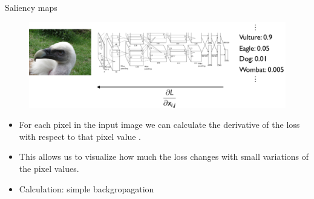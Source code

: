 \documentclass[xcolor=pdftex,dvipsnames,table]{beamer}
\begin{document}
\begin{frame}{Saliency maps}
	\begin{figure}[htb]
	  \centering
	  \includegraphics[width=\textwidth]{../graphics/Vis_saliency_map_principle.png}
	\end{figure}
\begin{itemize}
	\item For each pixel in the input image we can calculate the derivative of the loss with respect to that pixel value \cite{Simonyan:2013}.
	\item This allows us to visualize how much the loss changes with small variations of the pixel values.
	\item Calculation: simple backgropagation 
\end{itemize}
\end{frame}

\end{document}
